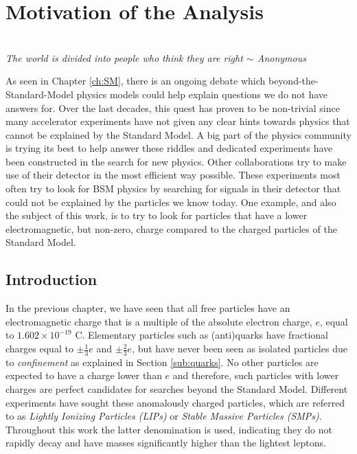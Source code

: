 \chapter{Motivation of the Analysis}
\label{ch:theoreticalmotivation}
\begin{flushright}
\textit{\\The world is divided into people who think they are right $\sim$ Anonymous\\}
\end{flushright}

\noindent As seen in Chapter \ref{ch:SM}, there is an ongoing debate which beyond-the-Standard-Model physics models could help explain questions we do not have answers for. Over the last decades, this quest has proven to be non-trivial since many accelerator experiments have not given any clear hints towards physics that cannot be explained by the Standard Model. A big part of the physics community is trying its best to help answer these riddles and dedicated experiments have been constructed in the search for new physics. Other collaborations try to make use of their detector in the most efficient way possible. These experiments most often try to look for BSM physics by searching for signals in their detector that could not be explained by the particles we know today. One example, and also the subject of this work, is to try to look for particles that have a lower electromagnetic, but non-zero, charge compared to the charged particles of the Standard Model.

\section{Introduction}
In the previous chapter, we have seen that all free particles have an electromagnetic charge that is a multiple of the absolute electron charge, $e$, equal to $1.602 \times 10^{-19}$ C. Elementary particles such as (anti)quarks have fractional charges equal to $\pm\frac{1}{3}e$ and $\pm\frac{2}{3}e$, but have never been seen as isolated particles due to \textit{confinement} as explained in Section \ref{sub:quarks}. No other particles are expected to have a charge lower than $e$ and therefore, such particles with lower charges are perfect candidates for searches beyond the Standard Model. Different experiments have sought these anomalously charged particles, which are referred to as \textit{Lightly Ionizing Particles (LIPs)} or \textit{Stable Massive Particles (SMPs)}. Throughout this work the latter denomination is used, indicating they do not rapidly decay and have masses significantly higher than the lightest leptons.

